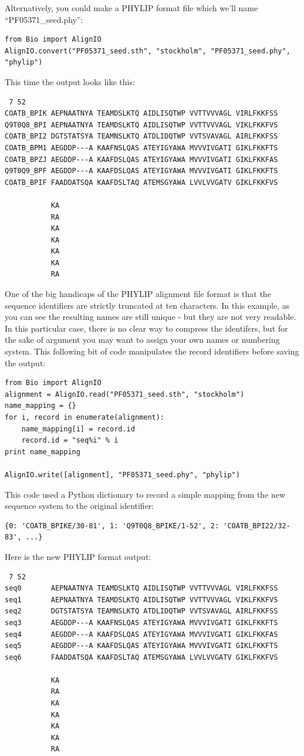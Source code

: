 \documentclass{report}
\begin{document}
Alternatively, you could make a PHYLIP format file which we'll name ``PF05371\_seed.phy'':

\begin{verbatim}
from Bio import AlignIO
AlignIO.convert("PF05371_seed.sth", "stockholm", "PF05371_seed.phy", "phylip")
\end{verbatim}

This time the output looks like this:

\begin{verbatim}
 7 52
COATB_BPIK AEPNAATNYA TEAMDSLKTQ AIDLISQTWP VVTTVVVAGL VIRLFKKFSS
Q9T0Q8_BPI AEPNAATNYA TEAMDSLKTQ AIDLISQTWP VVTTVVVAGL VIKLFKKFVS
COATB_BPI2 DGTSTATSYA TEAMNSLKTQ ATDLIDQTWP VVTSVAVAGL AIRLFKKFSS
COATB_BPM1 AEGDDP---A KAAFNSLQAS ATEYIGYAWA MVVVIVGATI GIKLFKKFTS
COATB_BPZJ AEGDDP---A KAAFDSLQAS ATEYIGYAWA MVVVIVGATI GIKLFKKFAS
Q9T0Q9_BPF AEGDDP---A KAAFDSLQAS ATEYIGYAWA MVVVIVGATI GIKLFKKFTS
COATB_BPIF FAADDATSQA KAAFDSLTAQ ATEMSGYAWA LVVLVVGATV GIKLFKKFVS

           KA
           RA
           KA
           KA
           KA
           KA
           RA
\end{verbatim}

One of the big handicaps of the PHYLIP alignment file format is that the sequence identifiers are strictly truncated at ten characters.  In this example, as you can see the resulting names are still unique - but they are not very readable.  In this particular case, there is no clear way to compress the identifers, but for the sake of argument you may want to assign your own names or numbering system.  This following bit of code manipulates the record identifiers before saving the output:

\begin{verbatim}
from Bio import AlignIO
alignment = AlignIO.read("PF05371_seed.sth", "stockholm")
name_mapping = {}
for i, record in enumerate(alignment):
    name_mapping[i] = record.id
    record.id = "seq%i" % i
print name_mapping

AlignIO.write([alignment], "PF05371_seed.phy", "phylip")
\end{verbatim}

\noindent This code used a Python dictionary to record a simple mapping from the new sequence system to the original identifier:
\begin{verbatim}
{0: 'COATB_BPIKE/30-81', 1: 'Q9T0Q8_BPIKE/1-52', 2: 'COATB_BPI22/32-83', ...}
\end{verbatim}

\noindent Here is the new PHYLIP format output:
\begin{verbatim}
 7 52
seq0       AEPNAATNYA TEAMDSLKTQ AIDLISQTWP VVTTVVVAGL VIRLFKKFSS
seq1       AEPNAATNYA TEAMDSLKTQ AIDLISQTWP VVTTVVVAGL VIKLFKKFVS
seq2       DGTSTATSYA TEAMNSLKTQ ATDLIDQTWP VVTSVAVAGL AIRLFKKFSS
seq3       AEGDDP---A KAAFNSLQAS ATEYIGYAWA MVVVIVGATI GIKLFKKFTS
seq4       AEGDDP---A KAAFDSLQAS ATEYIGYAWA MVVVIVGATI GIKLFKKFAS
seq5       AEGDDP---A KAAFDSLQAS ATEYIGYAWA MVVVIVGATI GIKLFKKFTS
seq6       FAADDATSQA KAAFDSLTAQ ATEMSGYAWA LVVLVVGATV GIKLFKKFVS

           KA
           RA
           KA
           KA
           KA
           KA
           RA
\end{verbatim}
\end{document}
